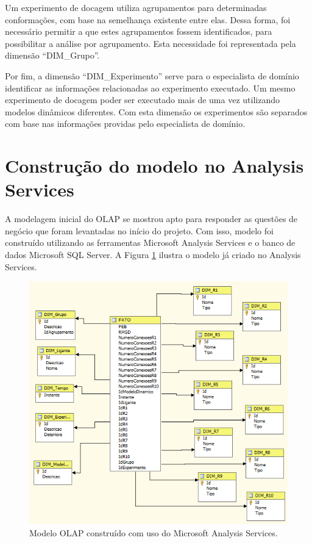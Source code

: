 Um experimento de docagem utiliza agrupamentos para determinadas conformações, com base na semelhança existente entre elas. Dessa forma, foi necessário permitir a que estes agrupamentos fossem identificados, para possibilitar a análise por agrupamento. Esta necessidade foi representada pela dimensão ``DIM\_Grupo''.

Por fim, a dimensão ``DIM\_Experimento'' serve para o especialista de domínio identificar as informações relacionadas ao experimento executado. Um mesmo experimento de docagem poder ser executado mais de uma vez utilizando modelos dinâmicos diferentes. Com esta dimensão os experimentos são separados com base nas informações providas pelo especialista de domínio.


\section{Construção do modelo no Analysis Services}

A modelagem inicial do OLAP se mostrou apto para responder as questões de negócio que foram levantadas no início do projeto. Com isso, modelo foi construído utilizando as ferramentas Microsoft Analysis Services e o banco de dados Microsoft SQL Server. A Figura \ref{fig:ModeloOLAP} ilustra o modelo já criado no Analysis Services.

\begin{figure}[h]
        \center
        \includegraphics[scale=1]{images/ModelagemOLAP.PNG}
        \caption{Modelo OLAP construído com uso do Microsoft Analysis Services.}
        \label{fig:ModeloOLAP}
\end{figure}

